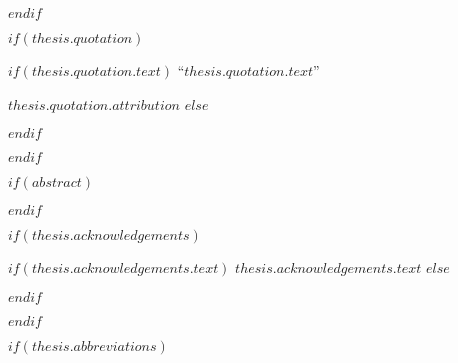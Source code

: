 \cleardoublepage
$endif$

$if(thesis.quotation)$

\vspace*{0.2\textheight}

$if(thesis.quotation.text)$
\noindent``{\itshape $thesis.quotation.text$}''\bigbreak

\hfill $thesis.quotation.attribution$
$else$

$endif$

$endif$

$if(abstract)$

\begin{abstract}
\addchaptertocentry{\abstractname} %
$abstract$
\end{abstract}

$endif$

$if(thesis.acknowledgements)$

\begin{acknowledgements}
\addchaptertocentry{\acknowledgementname} %
$if(thesis.acknowledgements.text)$
$thesis.acknowledgements.text$
$else$

$endif$
\end{acknowledgements}

$endif$


\begingroup
\hypersetup{linkcolor=$if(toclinkcolor)$$toclinkcolor$$else$black$endif$}

\tableofcontents %

\listoffigures %

\listoftables %

\endgroup


$if(thesis.abbreviations)$

